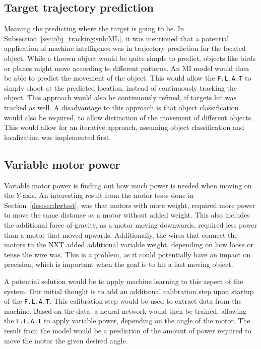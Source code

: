 \subsection{Target trajectory prediction}
Meaning the predicting where the target is going to be.
In Subsection~\ref{sec:obj_tracking:sub:ML}, it was mentioned that a potential application of machine intelligence was in trajectory prediction for the located object.
While a thrown object would be quite simple to predict, objects like birds or planes might move according to different patterns.
An MI model would then be able to predict the movement of the object.
This would allow the \texttt{F.L.A.T} to simply shoot at the predicted location, instead of continuously tracking the object.
This approach would also be continuously refined, if targets hit was tracked as well.
A disadvantage to this approach is that object classification would also be required, to allow distinction of the movement of different objects.
This would allow for an iterative approach, assuming object classification and localization was implemented first.

\subsection{Variable motor power}
Variable motor power is finding out how much power is needed when moving on the $Y$-axis.
An interesting result from the motor tests done in Section~\ref{des:sec:hwtest}, was that motors with more weight, required more power to move the same distance as a motor without added weight.
This also includes the additional force of gravity, as a motor moving downwards, required less power than a motor that moved upwards.
Additionally, the wires that connect the motors to the NXT added additional variable weight, depending on how loose or tense the wire was.
This is a problem, as it could potentially have an impact on precision, which is important when the goal is to hit a fast moving object.

A potential solution would be to apply machine learning to this aspect of the system.
Our initial thought is to add an additional calibration step upon startup of the \texttt{F.L.A.T}.
This calibration step would be used to extract data from the machine.
Based on the data, a neural network would then be trained, allowing the \texttt{F.L.A.T} to apply variable power, depending on the angle of the motor.
The result from the model would be a prediction of the amount of power required to move the motor the given desired angle.


